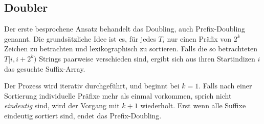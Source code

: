 \subsection{Doubler}
\label{sec:ansatz:doubler}
Der  erste besprochene Ansatz behandelt das Doubling, auch Prefix-Doubling genannt.
Die grundsätzliche Idee ist es, für jedes $T_i$ nur einen Präfix von $2^k$ Zeichen zu betrachten und lexikographisch zu sortieren. Falls die so betrachteten $T[i, i + 2^k)$ Strings paarweise verschieden sind, ergibt sich aus ihren Startindizen $i$ das gesuchte Suffix-Array. 

Der Prozess wird iterativ durchgeführt, und beginnt bei $k = 1$. Falls nach einer Sortierung individuelle Präfixe mehr als einmal vorkommen, sprich nicht \textit{eindeutig} sind, wird der Vorgang mit $k + 1$ wiederholt. Erst wenn alle Suffixe eindeutig sortiert sind, endet das Prefix-Doubling.
